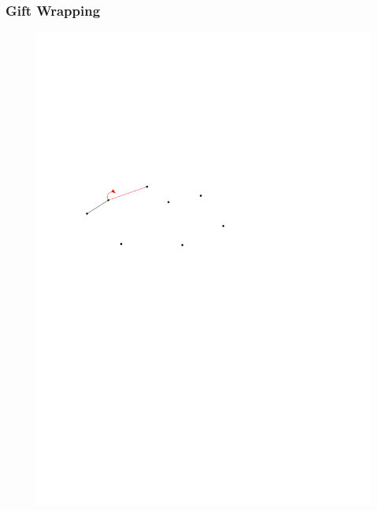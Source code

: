 \begin{frame}
	\frametitle{{Gift Wrapping}}
\begin{figure}[htbp]
	\begin{center}
  	\includegraphics[width=.8\linewidth]{bilder/giftwrap2}
	\end{center}
\end{figure}
\end{frame}


